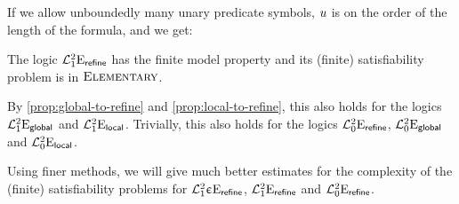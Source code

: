 If we allow unboundedly many unary predicate symbols, $u$ is on the order of
the length of the formula, and we get:
\begin{proposition}
The logic $\mathcal{L}^{2}_{1}{{}}\mathrm{E}_{\mathsf{refine}}$ has the finite model property and its
(finite) satisfiability problem is in $\text{\normalfont{\scshape Elementary}}$.

By \cref{prop:global-to-refine} and \cref{prop:local-to-refine},
this also holds for the logics $\mathcal{L}^{2}_{1}{{}}\mathrm{E}_{\mathsf{global}}$
and $\mathcal{L}^{2}_{1}{{}}\mathrm{E}_{\mathsf{local}}$.
Trivially, this also holds for the logics $\mathcal{L}^{2}_{0}{{}}\mathrm{E}_{\mathsf{refine}}$,
$\mathcal{L}^{2}_{0}{{}}\mathrm{E}_{\mathsf{global}}$ and $\mathcal{L}^{2}_{0}{{}}\mathrm{E}_{\mathsf{local}}$.
\end{proposition}

Using finer methods, we will give much better estimates for the complexity of
the (finite) satisfiability problems for $\mathcal{L}^{2}_{1}{\upepsilon}\mathrm{E}_{\mathsf{refine}}$,
$\mathcal{L}^{2}_{1}{{}}\mathrm{E}_{\mathsf{refine}}$ and $\mathcal{L}^{2}_{0}{{}}\mathrm{E}_{\mathsf{refine}}$.